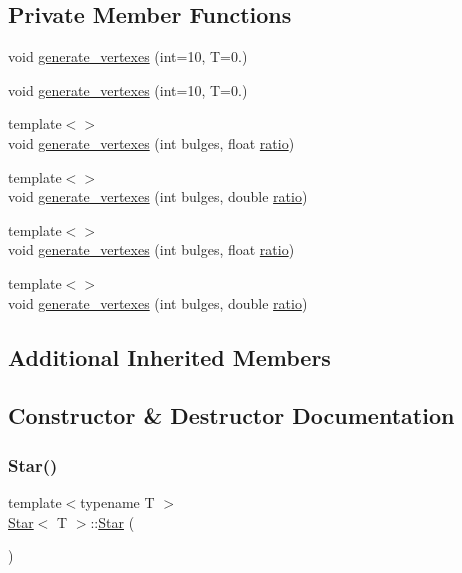 \subsection*{Private Member Functions}
\begin{DoxyCompactItemize}
\item 
void \mbox{\hyperlink{classStar_ac9ce42a8f7289484594f7f0ab5124849}{generate\+\_\+vertexes}} (int=10, T=0.)
\item 
void \mbox{\hyperlink{classStar_ac9ce42a8f7289484594f7f0ab5124849}{generate\+\_\+vertexes}} (int=10, T=0.)
\item 
{\footnotesize template$<$$>$ }\\void \mbox{\hyperlink{classStar_ab46cbc7aca971bc1c07b8d4afe8fba37}{generate\+\_\+vertexes}} (int bulges, float \mbox{\hyperlink{classStar_a349e0820769da7e4f76aea0ad6002bf8}{ratio}})
\item 
{\footnotesize template$<$$>$ }\\void \mbox{\hyperlink{classStar_a85d8438cea72701a136b76f046ee95dd}{generate\+\_\+vertexes}} (int bulges, double \mbox{\hyperlink{classStar_a349e0820769da7e4f76aea0ad6002bf8}{ratio}})
\item 
{\footnotesize template$<$$>$ }\\void \mbox{\hyperlink{classStar_ab46cbc7aca971bc1c07b8d4afe8fba37}{generate\+\_\+vertexes}} (int bulges, float \mbox{\hyperlink{classStar_a349e0820769da7e4f76aea0ad6002bf8}{ratio}})
\item 
{\footnotesize template$<$$>$ }\\void \mbox{\hyperlink{classStar_a85d8438cea72701a136b76f046ee95dd}{generate\+\_\+vertexes}} (int bulges, double \mbox{\hyperlink{classStar_a349e0820769da7e4f76aea0ad6002bf8}{ratio}})
\end{DoxyCompactItemize}
\subsection*{Additional Inherited Members}


\subsection{Constructor \& Destructor Documentation}
\mbox{\label{classStar_a4be07c82320f781071409294614df4ae}} 
\subsubsection{\texorpdfstring{Star()}{Star()}\hspace{0.1cm}{\footnotesize\ttfamily [1/8]}}
{\footnotesize\ttfamily template$<$typename T $>$ \\
\mbox{\hyperlink{classStar}{Star}}$<$ T $>$\+::\mbox{\hyperlink{classStar}{Star}} (\begin{DoxyParamCaption}{ }\end{DoxyParamCaption})}

